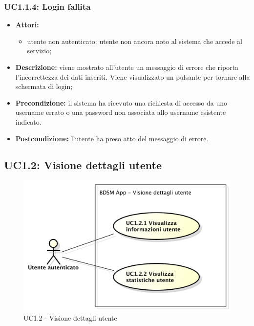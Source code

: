 \subsubsection{UC1.1.4: Login fallita}

\begin{itemize}
	\item \textbf{Attori:}
	\begin{itemize}
		\item utente non autenticato: utente non ancora noto al sistema che accede al servizio;
	\end{itemize}
	\item \textbf{Descrizione:} viene mostrato all'utente un messaggio di errore che riporta l'incorrettezza dei dati inseriti. Viene visualizzato un pulsante per tornare alla schermata di login;
	\item \textbf{Precondizione:} il sistema ha ricevuto una richiesta di accesso da uno username errato o una password non associata allo username esistente indicato.
	\item \textbf{Postcondizione:} l'utente ha preso atto del messaggio di errore.
\end{itemize}

\pagebreak

\subsection{UC1.2: Visione dettagli utente}

\begin{figure}[htbp]
	\centering
	\centerline{\includegraphics[scale=0.45]{./images/UC1_2.pdf}}
	\caption{UC1.2 - Visione dettagli utente}
\end{figure}

